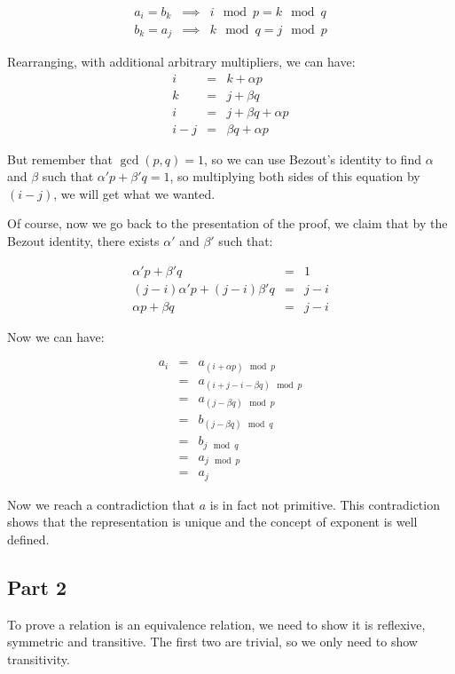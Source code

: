 \documentclass{article}
\begin{document}
\begin{eqnarray*}
  a_i = b_k &\implies& i \mod p = k \mod q \\
  b_k = a_j &\implies& k \mod q = j \mod p
\end{eqnarray*}

Rearranging, with additional arbitrary multipliers, we can have:
\begin{eqnarray*}
      i &=& k + \alpha p           \\
      k &=& j + \beta q            \\
      i &=& j + \beta q + \alpha p \\
  i - j &=& \beta q + \alpha p
\end{eqnarray*}

But remember that $ \gcd(p, q) = 1 $, so we can use Bezout's identity to find $ \alpha $ and $ \beta $ such that $ \alpha' p + \beta' q = 1 $, so multiplying both sides of this equation by $ (i - j) $, we will get what we wanted.

Of course, now we go back to the presentation of the proof, we claim that by the Bezout identity, there exists $ \alpha' $ and $ \beta' $ such that:

\begin{eqnarray*}
               \alpha' p + \beta' q &=& 1     \\
  (j - i) \alpha' p + (j-i)\beta' q &=& j - i \\
                 \alpha p + \beta q &=& j - i
\end{eqnarray*}

Now we can have:

\begin{eqnarray*}
  a_i &=& a_{(i + \alpha p) \mod p}        \\
      &=& a_{(i + j - i - \beta q) \mod p} \\
      &=& a_{(j - \beta q) \mod p}         \\
      &=& b_{(j - \beta q) \mod q}         \\
      &=& b_{j \mod q}                     \\
      &=& a_{j \mod p}                     \\
      &=& a_j
\end{eqnarray*}

Now we reach a contradiction that $ a $ is in fact not primitive. This contradiction shows that the representation is unique and the concept of exponent is well defined.

\subsection*{Part 2}
To prove a relation is an equivalence relation, we need to show it is reflexive, symmetric and transitive. The first two are trivial, so we only need to show transitivity.
\end{document}
